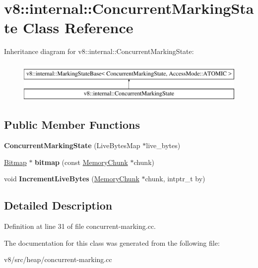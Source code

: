 \hypertarget{classv8_1_1internal_1_1ConcurrentMarkingState}{}\section{v8\+:\+:internal\+:\+:Concurrent\+Marking\+State Class Reference}
\label{classv8_1_1internal_1_1ConcurrentMarkingState}
Inheritance diagram for v8\+:\+:internal\+:\+:Concurrent\+Marking\+State\+:\begin{figure}[H]
\begin{center}
\leavevmode
\includegraphics[height=2.000000cm]{classv8_1_1internal_1_1ConcurrentMarkingState}
\end{center}
\end{figure}
\subsection*{Public Member Functions}
\begin{DoxyCompactItemize}
\item 
\mbox{\label{classv8_1_1internal_1_1ConcurrentMarkingState_a43ce56148711afdaea3ec6e1de4cf70a}} 
{\bfseries Concurrent\+Marking\+State} (Live\+Bytes\+Map $\ast$live\+\_\+bytes)
\item 
\mbox{\label{classv8_1_1internal_1_1ConcurrentMarkingState_ae065ec78848fd0067f0650e452d62552}} 
\mbox{\hyperlink{classv8_1_1internal_1_1Bitmap}{Bitmap}} $\ast$ {\bfseries bitmap} (const \mbox{\hyperlink{classv8_1_1internal_1_1MemoryChunk}{Memory\+Chunk}} $\ast$chunk)
\item 
\mbox{\label{classv8_1_1internal_1_1ConcurrentMarkingState_ab504ff170b248afc18faa01a262bfa73}} 
void {\bfseries Increment\+Live\+Bytes} (\mbox{\hyperlink{classv8_1_1internal_1_1MemoryChunk}{Memory\+Chunk}} $\ast$chunk, intptr\+\_\+t by)
\end{DoxyCompactItemize}


\subsection{Detailed Description}


Definition at line 31 of file concurrent-\/marking.\+cc.



The documentation for this class was generated from the following file\+:\begin{DoxyCompactItemize}
\item 
v8/src/heap/concurrent-\/marking.\+cc\end{DoxyCompactItemize}
